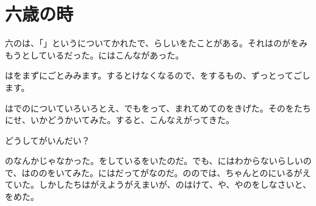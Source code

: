 \documentclass[18pt,a4paper,oneside,openany]{book}
\begin{document}
\tableofcontents


\chapter{六歳の時}


\linespread{1.8}
\selectfont

六のは、「」というについてかれたで、らしいをたことがある。それはのがをみもうとしているだった。にはこんながあった。

はをまずにごとみみます。するとけなくなるので、をするもの、ずっとってごします。

はでのについていろいろとえ、でもをって、まれてめてのをきげた。そのをたちにせ、いかどうかいてみた。すると、こんなえがってきた。

どうしてがいんだい？

のなんかじゃなかった。をしているをいたのだ。でも、にはわからないらしいので、はののをいてみた。にはだってがなのだ。ののでは、ちゃんとのにいるがえていた。しかしたちはがえようがえまいが、のはけて、や、やのをしなさいと、をめた。
\end{document}
